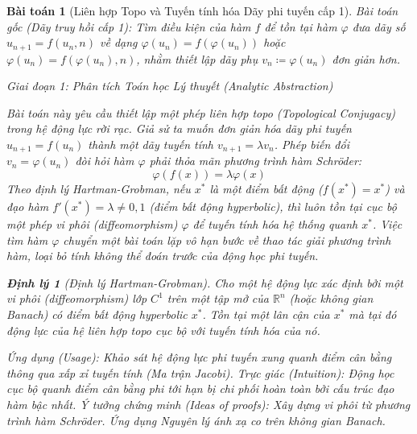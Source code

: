 \documentclass{article}
\newtheorem{baitoan}{Bài toán}
\newtheorem{dinhly}{Định lý}
\begin{document}
\begin{baitoan}[Liên hợp Topo và Tuyến tính hóa Dãy phi tuyến cấp 1]
 \emph{Bài toán gốc (Dãy truy hồi cấp 1):} 
 Tìm điều kiện của hàm $f$ để tồn tại hàm $\varphi$ đưa dãy số $u_{n+1} = f(u_n,n)$ về dạng $\varphi(u_n) = f(\varphi(u_n))$ hoặc $\varphi(u_n) = f(\varphi(u_n),n)$, nhằm thiết lập dãy phụ $v_n\coloneqq\varphi(u_n)$ đơn giản hơn.

\vspace{0.5em}\noindent\emph{Giai đoạn 1: Phân tích Toán học Lý thuyết (Analytic Abstraction)}
 
 Bài toán này yêu cầu thiết lập một phép liên hợp topo (Topological Conjugacy) trong hệ động lực rời rạc.
 Giả sử ta muốn đơn giản hóa dãy phi tuyến $u_{n+1} = f(u_n)$ thành một dãy tuyến tính $v_{n+1} = \lambda v_n$. Phép biến đổi $v_n = \varphi(u_n)$ đòi hỏi hàm $\varphi$ phải thỏa mãn phương trình hàm Schröder:
 \begin{equation}
 \varphi(f(x)) = \lambda \varphi(x)
 \end{equation}
 Theo định lý Hartman-Grobman, nếu $x^*$ là một điểm bất động ($f(x^*) = x^*$) và đạo hàm $f'(x^*) = \lambda \neq 0, 1$ (điểm bất động hyperbolic), thì luôn tồn tại cục bộ một phép vi phôi (diffeomorphism) $\varphi$ để tuyến tính hóa hệ thống quanh $x^*$. Việc tìm hàm $\varphi$ chuyển một bài toán lặp vô hạn bước về thao tác giải phương trình hàm, loại bỏ tính không thể đoán trước của động học phi tuyến.

\begin{dinhly}[Định lý Hartman-Grobman]
Cho một hệ động lực xác định bởi một vi phôi (diffeomorphism) lớp $C^1$ trên một tập mở của $\mathbb{R}^n$ (hoặc không gian Banach) có điểm bất động hyperbolic $x^*$. Tồn tại một lân cận của $x^*$ mà tại đó động lực của hệ liên hợp topo cục bộ với tuyến tính hóa của nó.
\end{dinhly}
\emph{Ứng dụng (Usage):} Khảo sát hệ động lực phi tuyến xung quanh điểm cân bằng thông qua xấp xỉ tuyến tính (Ma trận Jacobi).
\emph{Trực giác (Intuition):} Động học cục bộ quanh điểm cân bằng phi tới hạn bị chi phối hoàn toàn bởi cấu trúc đạo hàm bậc nhất.
\emph{Ý tưởng chứng minh (Ideas of proofs):} Xây dựng vi phôi từ phương trình hàm Schröder. Ứng dụng Nguyên lý ánh xạ co trên không gian Banach.


\end{baitoan}
\end{document}
